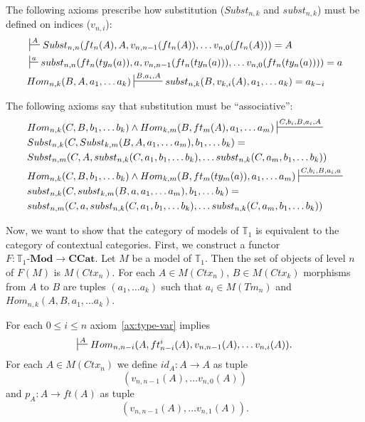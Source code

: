 \documentclass[reqno]{amsart}
\theoremstyle{definition}
\theoremstyle{remark}
\newcommand{\cat}[1]{\mathbf{#1}}
\newcommand{\ccat}{\cat{CCat}}
\newcommand{\Mod}[1]{#1\text{-}\cat{Mod}}
\numberwithin{figure}{section}
\begin{document}
The following axioms prescribe how substitution ($Subst_{n,k}$ and $subst_{n,k}$) must be defined on indices ($v_{n,i}$):
\begin{align}
\label{ax:Subst-var}
& \sststile{}{A}         Subst_{n,n}(ft_n(A), A, v_{n,n-1}(ft_n(A)), \ldots v_{n,0}(ft_n(A))) = A \\
\label{ax:subst-var}
& \sststile{}{a}         subst_{n,n}(ft_n(ty_n(a)), a, v_{n,n-1}(ft_n(ty_n(a))), \ldots v_{n,0}(ft_n(ty_n(a)))) = a \\
\label{ax:var-subst}
& Hom_{n,k}(B, A, a_1, \ldots a_k) \sststile{}{B, a_i, A} subst_{n,k}(B, v_{k,i}(A), a_1, \ldots a_k) = a_{k-i}
\end{align}

The following axioms say that substitution must be ``associative'':
\begin{align}
\label{ax:Subst-Subst}
& Hom_{n,k}(C, B, b_1, \ldots b_k) \land Hom_{k,m}(B, ft_m(A), a_1, \ldots a_m) \sststile{}{C, b_i, B, a_i, A} \\ \notag
& Subst_{n,k}(C, Subst_{k,m}(B, A, a_1, \ldots a_m), b_1, \ldots b_k) = \\ \notag
& Subst_{n,m}(C, A, subst_{n,k}(C, a_1, b_1, \ldots b_k), \ldots subst_{n,k}(C, a_m, b_1, \ldots b_k)) \\
\label{ax:subst-subst}
& Hom_{n,k}(C, B, b_1, \ldots b_k) \land Hom_{k,m}(B, ft_m(ty_m(a)), a_1, \ldots a_m) \sststile{}{C, b_i, B, a_i, a} \\ \notag
& subst_{n,k}(C, subst_{k,m}(B, a, a_1, \ldots a_m), b_1, \ldots b_k) = \\ \notag
& subst_{n,m}(C, a, subst_{n,k}(C, a_1, b_1, \ldots b_k), \ldots subst_{n,k}(C, a_m, b_1, \ldots b_k))
\end{align}

Now, we want to show that the category of models of $\mathbb{T}_1$ is equivalent to the category of contextual categories.
First, we construct a functor $F : \Mod{\mathbb{T}_1} \to \ccat$.
Let $M$ be a model of $\mathbb{T}_1$.
Then the set of objects of level $n$ of $F(M)$ is $M(Ctx_n)$.
For each $A \in M(Ctx_n)$, $B \in M(Ctx_k)$ morphisms from $A$ to $B$ are tuples $(a_1, \ldots a_k)$ such that $a_i \in M(Tm_n)$ and $Hom_{n,k}(A, B, a_1, \ldots a_k)$.

For each $0 \leq i \leq n$ axiom~\eqref{ax:type-var} implies
\[ \sststile{}{A} Hom_{n,n-i}(A, ft^i_{n-i}(A), v_{n,n-1}(A), \ldots v_{n,i}(A)). \]
For each $A \in M(Ctx_n)$ we define $id_A : A \to A$ as tuple
\[ (v_{n,n-1}(A), \ldots v_{n,0}(A)) \]
and $p_A : A \to ft(A)$ as tuple
\[ (v_{n,n-1}(A), \ldots v_{n,1}(A)). \]
\end{document}
